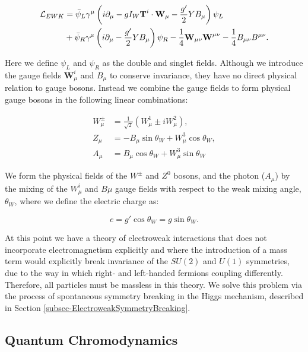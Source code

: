 \begin{equation}
\begin{split}
\mathcal{L}_{EWK} & = \bar{\psi}_L \gamma^{\mu} \left(i \partial_{\mu} - g I_W \textbf{T}^i \cdot \textbf{W}_{\mu} - \frac{g'}{2} Y B_{\mu}\right)\psi_L \\
& + \bar{\psi}_R \gamma^{\mu}\left(i \partial_{\mu} - \frac{g'}{2} Y B_{\mu}\right)\psi_R - \frac{1}{4}\textbf{W}_{\mu \nu}\textbf{W}^{\mu \nu} - \frac{1}{4} B_{\mu \nu} B^{\mu \nu} .
\end{split}
\end{equation}

Here we define $\psi_L$ and $\psi_R$ as the double and singlet fields. Although we introduce the gauge fields $\textbf{W}^i_{\mu}$ and $ B_{\mu}$ to conserve invariance, they have no direct physical relation to gauge bosons. Instead we combine the gauge fields to form physical gauge bosons in the following linear combinations:

\begin{align}
W^{\pm}_{\mu} & = \frac{1}{\sqrt{2}}(W^1_{\mu} \pm iW^2_{\mu}), \\
Z_{\mu} & = -B_{\mu}\sin\theta_W + W^3_{\mu}\cos\theta_W, \\
A_{\mu} & = B_{\mu}\cos\theta_W + W^3_{\mu}\sin\theta_W
\end{align}   

We form the physical fields of the $W^{\pm}$ and $Z^0$ bosons, and the photon ($A_{\mu}$) by the mixing of the $W^i_{\mu}$ and $B{\mu}$ gauge fields with respect to the weak mixing angle, $\theta_W$, where we define the electric charge as:

\begin{equation}
e = g'\cos\theta_W = g \sin\theta_W.
\end{equation}

At this point we have a theory of electroweak interactions that does not incorporate electromagnetism explicitly and where the introduction of a mass term would explicitly break invariance of the $SU(2)$ and $U(1)$ symmetries, due to the way in which right- and left-handed fermions coupling differently. Therefore, all particles must be massless in this theory. We solve this problem via the process of spontaneous symmetry breaking in the Higgs mechanism, described in Section \ref{subsec-ElectroweakSymmetryBreaking}.  

\subsection{Quantum Chromodynamics} \label{subsec-QuantumChromodynamics}

